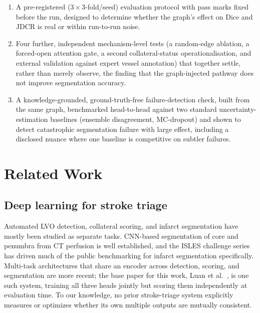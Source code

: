 \documentclass[conference]{IEEEtran}
\begin{document}
\begin{enumerate}
\item A pre-registered ($3\times3$-fold/seed) evaluation protocol with pass marks fixed before the run, designed to determine whether the graph's effect on Dice and JDCR is real or within run-to-run noise.
\item Four further, independent mechanism-level tests (a random-edge ablation, a forced-open attention gate, a second collateral-status operationalisation, and external validation against expert vessel annotation) that together settle, rather than merely observe, the finding that the graph-injected pathway does not improve segmentation accuracy.
\item A knowledge-grounded, ground-truth-free failure-detection check, built from the same graph, benchmarked head-to-head against two standard uncertainty-estimation baselines (ensemble disagreement, MC-dropout) and shown to detect catastrophic segmentation failure with large effect, including a disclosed nuance where one baseline is competitive on subtler failures.
\end{enumerate}

\section{Related Work}

\subsection{Deep learning for stroke triage}
Automated LVO detection, collateral scoring, and infarct segmentation have mostly been studied as separate tasks. CNN-based segmentation of core and penumbra from CT perfusion is well established, and the ISLES challenge series \cite{isles2024} has driven much of the public benchmarking for infarct segmentation specifically. Multi-task architectures that share an encoder across detection, scoring, and segmentation are more recent; the base paper for this work, Luan et al.\ \cite{luan2026}, is one such system, training all three heads jointly but scoring them independently at evaluation time. To our knowledge, no prior stroke-triage system explicitly measures or optimizes whether its own multiple outputs are mutually consistent.
\end{document}

